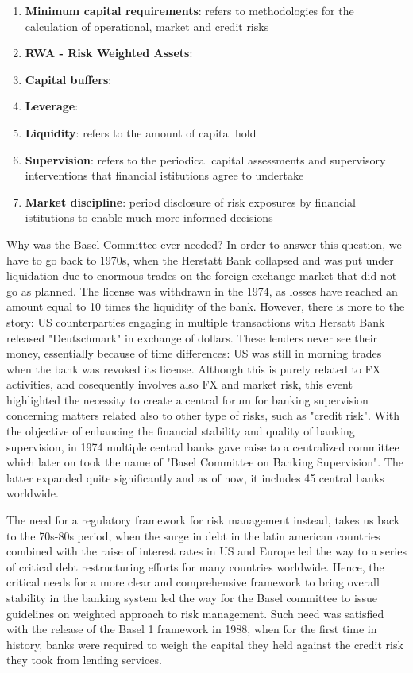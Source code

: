 \documentclass[a4paper,12pt]{article}
\begin{document}
    \begin{enumerate}
        \item \textbf{Minimum capital requirements}: refers to methodologies for the calculation of operational, market and credit risks
        \item \textbf{RWA - Risk Weighted Assets}:
        \item \textbf{Capital buffers}:
        \item \textbf{Leverage}: 
        \item \textbf{Liquidity}: refers to the amount of capital hold
        \item \textbf{Supervision}: refers to the periodical capital assessments and supervisory interventions that financial istitutions agree to undertake
        \item \textbf{Market discipline}: period disclosure of risk exposures by financial istitutions to enable much more informed decisions
    \end{enumerate}

    Why was the Basel Committee ever needed? In order to answer this question, we have to go back to 1970s, when the Herstatt Bank collapsed and was put under liquidation 
    due to enormous trades on the foreign exchange market that did not go as planned. The license was withdrawn in the 1974, as losses have reached an amount equal to 10 times
    the liquidity of the bank. However, there is more to the story: US counterparties engaging in multiple transactions with Hersatt Bank released "Deutschmark" in exchange of dollars.
    These lenders never see their money, essentially because of time differences: US was still in morning trades when the bank was revoked its license. Although this is purely related to FX activities, 
    and cosequently involves also FX and market risk, this event highlighted the necessity to create a central forum for banking supervision concerning matters related also to other type of risks, 
    such as "credit risk". With the objective of enhancing the financial stability and quality of banking supervision, in 1974 multiple central banks gave raise to a centralized committee which later on 
    took the name of "Basel Committee on Banking Supervision". The latter expanded quite significantly and as of now, it includes 45 central banks worldwide.

    The need for a regulatory framework for risk management instead, takes us back to the 70s-80s period, when the surge in debt in the latin american countries combined with the raise of interest rates
    in US and Europe led the way to a series of critical debt restructuring efforts for many countries worldwide. Hence, the critical needs for a more clear and comprehensive framework to bring overall 
    stability in the banking system led the way for the Basel committee to issue guidelines on weighted approach to risk management. Such need was satisfied with the release of the Basel 1 framework in 1988, 
    when for the first time in history, banks were required to weigh the capital they held against the credit risk they took from lending services. 
    
\end{document}
